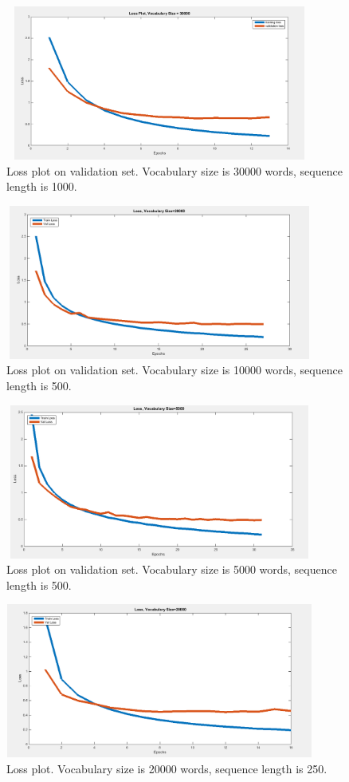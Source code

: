 \documentclass[12pt]{article}
\begin{document}
\begin{figure}[H]
\centering
\includegraphics[height=2in, width=4in]{Images/loss_nsf_30000_1000.png}
\caption{Loss plot on validation set. Vocabulary size is 30000 words, sequence length is 1000.}
\end{figure}

\begin{figure}[H]
\centering
\includegraphics[height=2in, width=4in]{Images/loss_nsf_10000_500.png}
\caption{Loss plot on validation set. Vocabulary size is 10000 words, sequence length is 500.}
\end{figure}


\begin{figure}[H]
\centering
\includegraphics[height=2in, width=4in]{Images/loss_nsf_5000_500.png}
\caption{Loss plot on validation set. Vocabulary size is 5000 words, sequence length is 500.}
\end{figure}

\begin{figure}[H]
\centering
\includegraphics[height=2in, width=4in]{Images/loss_nsf_20000_250.png}
\caption{Loss plot. Vocabulary size is 20000 words, sequence length is 250.}
\end{figure}
\end{document}
